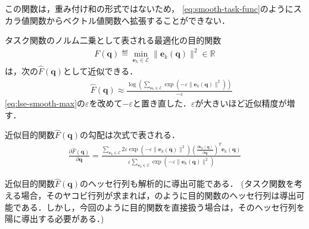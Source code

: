 この関数は，重み付け和の形式ではないため，
\eqref{eq:smooth-task-func}のようにスカラ値関数からベクトル値関数へ拡張することができない．

タスク関数のノルム二乗として表される最適化の目的関数
\begin{eqnarray}
  F(\bm{q}) \eqdef \min_{\bm{e}_k \in \mathcal{E}} \| \bm{e}_k(\bm{q}) \|^2 \in \mathbb{R}
\end{eqnarray}
は，次の$\hat{F}(\bm{q})$として近似できる．
\begin{eqnarray}
  && \hat{F}(\bm{q}) \approx
  \frac{\log\left(\sum_{\bm{e}_k \in \mathcal{E}} \exp(- \varepsilon \| \bm{e}_k(\bm{q}) \|^2)\right)}{- \varepsilon}
\end{eqnarray}
\eqref{eq:lse-smooth-max}の$\varepsilon$を改めて$- \varepsilon$と置き直した．$\varepsilon$が大きいほど近似精度が増す．

近似目的関数$\hat{F}(\bm{q})$の勾配は次式で表される．
\begin{eqnarray}
  \frac{\partial \hat{F}(\bm{q})}{\partial \bm{q}} =
  \frac{\sum_{\bm{e}_k \in \mathcal{E}} 2 \varepsilon \exp(- \varepsilon \| \bm{e}_k(\bm{q}) \|^2) \left(\frac{\partial \bm{e}_k(\bm{q})}{\partial \bm{q}}\right)^T \bm{e}_k(\bm{q})}
       {\varepsilon \sum_{\bm{e}_k \in \mathcal{E}} \exp(- \varepsilon \| \bm{e}_k(\bm{q}) \|^2)}
\end{eqnarray}

近似目的関数$\hat{F}(\bm{q})$のヘッセ行列も解析的に導出可能である．
(タスク関数を考える場合，そのヤコビ行列が求まれば，のように目的関数のヘッセ行列は導出可能である．しかし，今回のように目的関数を直接扱う場合は，そのヘッセ行列を陽に導出する必要がある．)
